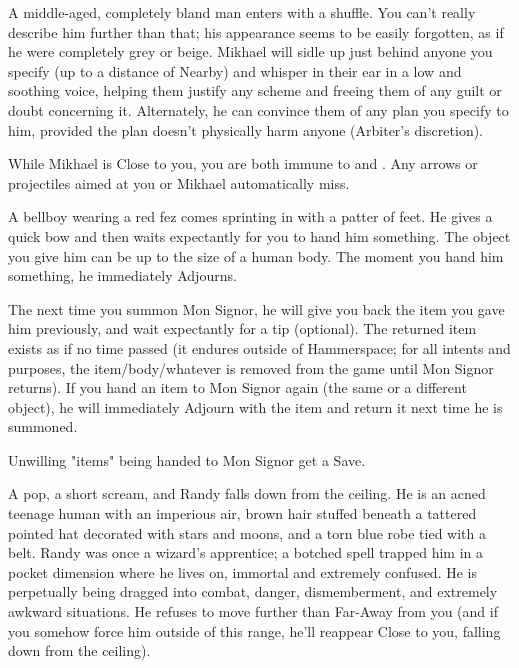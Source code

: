 A middle-aged, completely bland man enters with a shuffle.  You can't really describe him further than that; his appearance seems to be easily forgotten, as if he were completely grey or beige. Mikhael will sidle up just behind anyone you specify (up to a distance of Nearby) and whisper in their ear in a low and soothing voice, helping them justify any scheme and freeing them of any guilt or doubt concerning it. Alternately, he can convince them of any plan you specify to him, provided the plan doesn't physically harm anyone (Arbiter's discretion).

While Mikhael is Close to you, you are both immune to  and . Any arrows or projectiles aimed at you or Mikhael automatically miss. 



A bellboy wearing a red fez comes sprinting in with a patter of feet. He gives a quick bow and then waits expectantly for you to hand him something. The object you give him can be up to the size of a human body. The moment you hand him something, he immediately Adjourns.

The next time you summon Mon Signor, he will give you back the item you gave him previously, and wait expectantly for a tip (optional).  The returned item exists as if no time passed (it endures outside of Hammerspace; for all intents and purposes, the item/body/whatever is removed from the game until Mon Signor returns). If you hand an item to Mon Signor again (the same or a different object), he will immediately Adjourn with the item and return it next time he is summoned.

Unwilling "items" being handed to Mon Signor get a Save.


A pop, a short scream, and Randy falls down from the ceiling.  He is an acned teenage human with an imperious air, brown hair stuffed beneath a tattered pointed hat decorated with stars and moons, and a torn blue robe tied with a belt.  Randy was once a wizard's apprentice; a botched spell trapped him in a pocket dimension where he lives on, immortal and extremely confused. He is perpetually being dragged into combat, danger, dismemberment, and extremely awkward situations. He refuses to move further than Far-Away from you (and if you somehow force him outside of this range, he'll reappear Close to you, falling down from the ceiling).

